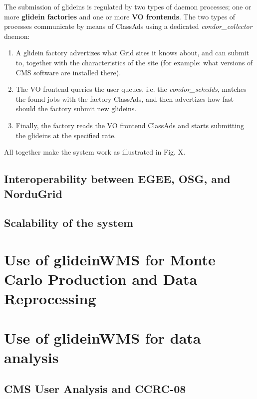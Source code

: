 \documentclass[a4paper]{jpconf}
\begin{document}
The submission of glideins is regulated by two types of daemon processes; 
one or more \textbf{glidein factories} and one or more \textbf{VO frontends}. 
The two types of processes communicate by means of ClassAds using a dedicated \emph{condor_collector} daemon:
\begin{enumerate}
\item A glidein factory advertizes what Grid sites it knows about, and can submit to, together with the characteristics of the site 
(for example: what versions of CMS software are installed there).
\item The VO frontend queries the user queues, i.e. the \emph{condor_schedds}, 
matches the found jobs with the factory ClassAds, 
and then advertizes how fast should the factory submit new glideins.
\item Finally, the factory reads the VO frontend ClassAds and starts submitting the glideins at the specified rate.
\end{enumerate}

All together make the system work as illustrated in Fig. X.

\subsection {Interoperability between EGEE, OSG, and NorduGrid}



\subsection {Scalability of the system}



\section{Use of glideinWMS for Monte Carlo Production and Data Reprocessing }



\section{Use of glideinWMS for data analysis}



\subsection{CMS User Analysis and CCRC-08}
\end{document}
